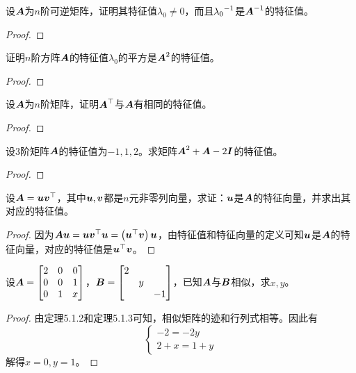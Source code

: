\begin{problem}
设\(\boldsymbol{A}\)为\(n\)阶可逆矩阵，证明其特征值\(\lambda_0\neq0\)，而且\({\lambda_0}^{-1}\)是\({\boldsymbol{A}}^{-1}\)的特征值。
\end{problem}
\begin{proof}
\end{proof}

\begin{problem}
证明\(n\)阶方阵\(\boldsymbol{A}\)的特征值\(\lambda_0\)的平方是\(\boldsymbol{A}^2\)的特征值。
\end{problem}
\begin{proof}
\end{proof}

\begin{problem}
设\(\boldsymbol{A}\)为\(n\)阶矩阵，证明\(\boldsymbol{A}^\top\)与\(\boldsymbol{A}\)有相同的特征值。
\end{problem}
\begin{proof}
\end{proof}

\begin{problem}
设\(3\)阶矩阵\(\boldsymbol{A}\)的特征值为\(-1,1,2\)。求矩阵\(\boldsymbol{A}^2+\boldsymbol{A}-2\boldsymbol{I}\)的特征值。
\end{problem}
\begin{proof}
\end{proof}

\begin{problem}
设\(\boldsymbol{A}=\boldsymbol{u}\boldsymbol{v}^\top\)，其中\(\boldsymbol{u},\boldsymbol{v}\)都是\(n\)元非零列向量，求证：\(\boldsymbol{u}\)是\(\boldsymbol{A}\)的特征向量，并求出其对应的特征值。
\end{problem}
\begin{proof}
    因为\(\boldsymbol{A}\boldsymbol{u}=\boldsymbol{u}\boldsymbol{v}^\top\boldsymbol{u}=\left( \boldsymbol{u}^\top\boldsymbol{v} \right)\boldsymbol{u}\)，由特征值和特征向量的定义可知\(\boldsymbol{u}\)是\(\boldsymbol{A}\)的特征向量，对应的特征值是\(\boldsymbol{u}^\top\boldsymbol{v}\)。
\end{proof}

\begin{problem}
设\(\boldsymbol{A}=\begin{bmatrix}2&0&0\\0&0&1\\0&1&x\end{bmatrix}\)，\(\boldsymbol{B}=\begin{bmatrix}2&&\\&y&\\&&-1\end{bmatrix}\)，已知\(\boldsymbol{A}\)与\(\boldsymbol{B}\)相似，求\(x,y\)。
\end{problem}
\begin{proof}
    由定理5.1.2和定理5.1.3可知，相似矩阵的迹和行列式相等。因此有
    \begin{equation*}
        \begin{cases}
            -2=-2y \\
            2+x=1+y
        \end{cases}
    \end{equation*}
    解得\(x=0,y=1\)。
\end{proof}

